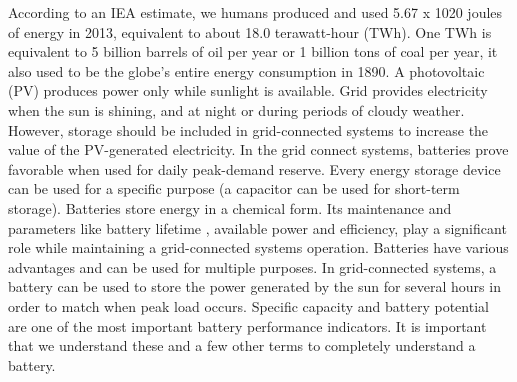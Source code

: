 According to an IEA estimate, we humans produced and used 5.67 x 1020 joules of energy in 2013, equivalent to about 18.0 terawatt-hour (TWh). One TWh is equivalent to 5 billion barrels of oil per year or 1 billion tons of coal per year, it also used to be the globe's entire energy consumption in 1890.
A photovoltaic (PV) produces power only while sunlight is available. Grid provides electricity when the sun is shining, and at night or during periods of cloudy weather. However, storage should be included in grid-connected systems to increase the value of the PV-generated electricity. In the grid connect systems, batteries prove favorable when used for daily peak-demand reserve. 
Every energy storage device can be used for a specific purpose (a capacitor can be used for short-term storage). Batteries store energy in a chemical form. Its maintenance and parameters like battery lifetime , available power and efficiency, play a significant role while maintaining a grid-connected systems operation. Batteries have various advantages and can be used for multiple purposes. In grid-connected systems, a battery can be used to store the power generated by the sun for several hours in order to match when peak load occurs. Specific capacity and battery potential are one of the most important battery performance indicators. It is important that we understand these and a few other terms to completely understand a battery. 
